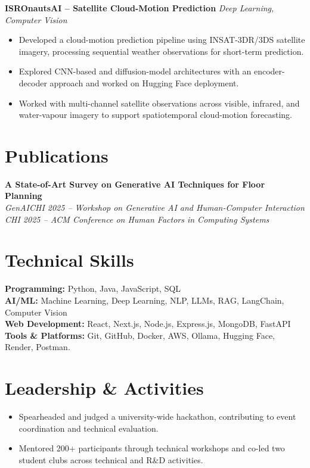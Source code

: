 \documentclass[10pt,a4paper]{article}
\newcommand{\resumeItem}[1]{
  \item\small{#1}
}
\newcommand{\projectHeading}[2]{
  \textbf{#1} \hfill \textit{\small #2}
}
\begin{document}
\projectHeading{ISROnautsAI -- Satellite Cloud-Motion Prediction}
{Deep Learning, Computer Vision}
\begin{itemize}
    \resumeItem{Developed a cloud-motion prediction pipeline using INSAT-3DR/3DS satellite imagery, processing sequential weather observations for short-term prediction.}
    \resumeItem{Explored CNN-based and diffusion-model architectures with an encoder-decoder approach and worked on Hugging Face deployment.}
    \resumeItem{Worked with multi-channel satellite observations across visible, infrared, and water-vapour imagery to support spatiotemporal cloud-motion forecasting.}
\end{itemize}

\section{Publications}

\small
\textbf{A State-of-Art Survey on Generative AI Techniques for Floor Planning}\\
\textit{GenAICHI 2025 -- Workshop on Generative AI and Human-Computer Interaction}\\
\textit{CHI 2025 -- ACM Conference on Human Factors in Computing Systems}

\section{Technical Skills}

\small
\textbf{Programming:} Python, Java, JavaScript, SQL\\
\textbf{AI/ML:} Machine Learning, Deep Learning, NLP, LLMs, RAG, LangChain, Computer Vision\\
\textbf{Web Development:} React, Next.js, Node.js, Express.js, MongoDB, FastAPI\\
\textbf{Tools \& Platforms:} Git, GitHub, Docker, AWS, Ollama, Hugging Face, Render, Postman.

\section{Leadership \& Activities}

\small
\begin{itemize}
    \resumeItem{Spearheaded and judged a university-wide hackathon, contributing to event coordination and technical evaluation.}
    \resumeItem{Mentored 200+ participants through technical workshops and co-led two student clubs across technical and R\&D activities.}
\end{itemize}
\end{document}
